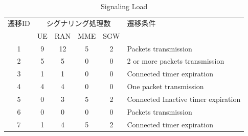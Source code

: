 \documentclass[a4j]{ujarticle}
\begin{document}
    \begin{table}[htbp]
      \centering
      \caption{Signaling Load}
      \label{table:signalings_all}
      \begin{tabular}{c|cccc|l}
        \hline
        遷移ID  & \multicolumn{4}{|c|}{シグナリング処理数} & 遷移条件                          \\
                & UE      & RAN     & MME     & SGW      &                                   \\ \hline \hline
        1       & 9       & 12      & 5       & 2        & Packets transmission              \\
        2       & 5       & 5       & 0       & 0        & 2 or more packets transmission    \\
        3       & 1       & 1       & 0       & 0        & Connected timer expiration        \\
        4       & 4       & 4       & 0       & 0        & One packet transmission           \\
        5       & 0       & 3       & 5       & 2        & Connected Inactive timer expiration             \\
        6       & 0       & 0       & 0       & 0        & Packets transmission              \\
        7       & 1       & 4       & 5       & 2        & Connected timer expiration            \\ \hline
      \end{tabular}
    \end{table}

%
\end{document}

